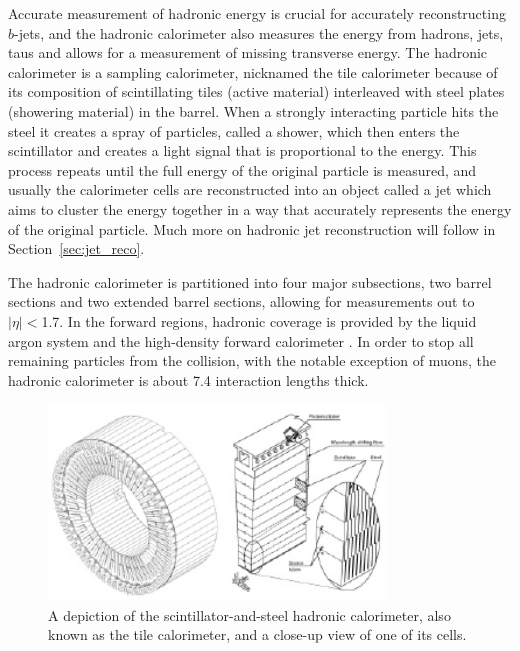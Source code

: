Accurate measurement of hadronic energy is crucial for accurately reconstructing $b$-jets, and the hadronic calorimeter also measures the 
energy from hadrons, jets, taus and allows for a measurement of missing transverse energy.  The hadronic calorimeter 
is a sampling calorimeter, nicknamed the tile calorimeter because of its composition of scintillating tiles (active material) 
interleaved with steel plates (showering material) in the barrel.  When a strongly interacting particle hits the steel it creates a 
spray of particles, called a shower, which then enters the scintillator and creates a light signal that is 
proportional to the energy.  This process repeats until the full energy of the original particle is measured, and 
usually the calorimeter cells are reconstructed into an object called a jet which aims to cluster the energy together in 
a way that accurately represents the energy of the original particle.  Much more on hadronic jet reconstruction will follow in Section~\ref{sec:jet_reco}.

The hadronic calorimeter is partitioned into four major subsections, two barrel sections and two extended barrel sections, allowing 
for measurements out to $|\eta|<$1.7.  In the forward regions, hadronic coverage is provided 
by the liquid argon system and the high-density forward calorimeter \cite{cal_tdr}. 
In order to stop all remaining particles from the collision, 
with the notable exception of muons, the hadronic calorimeter is about 7.4 interaction lengths thick.

\begin{figure}
	\includegraphics[width=0.8\textwidth]{ATLASDetector/images/tile_cal.pdf}
	\caption{A depiction of the scintillator-and-steel hadronic calorimeter, also known as the tile calorimeter, and a close-up view of one of its cells.	\label{fig:tile_cal}}
\end{figure}



